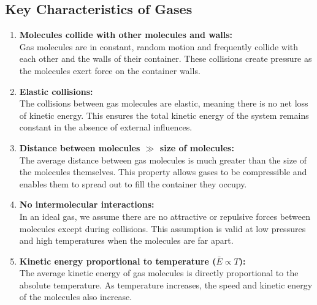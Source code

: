 \documentclass{report}
\begin{document}
\subsection{Key Characteristics of Gases}
\begin{enumerate}
	\item \textbf{Molecules collide with other molecules and walls:} \\
	      Gas molecules are in constant, random motion and frequently collide with each other and the walls of their container. These collisions create pressure as the molecules exert force on the container walls.

	\item \textbf{Elastic collisions:} \\
	      The collisions between gas molecules are elastic, meaning there is no net loss of kinetic energy. This ensures the total kinetic energy of the system remains constant in the absence of external influences.

	\item \textbf{Distance between molecules $\gg$ size of molecules:} \\
	      The average distance between gas molecules is much greater than the size of the molecules themselves. This property allows gases to be compressible and enables them to spread out to fill the container they occupy.

	\item \textbf{No intermolecular interactions:} \\
	      In an ideal gas, we assume there are no attractive or repulsive forces between molecules except during collisions. This assumption is valid at low pressures and high temperatures when the molecules are far apart.

	\item \textbf{Kinetic energy proportional to temperature ($\bar{E} \propto T$):} \\
	      The average kinetic energy of gas molecules is directly proportional to the absolute temperature. As temperature increases, the speed and kinetic energy of the molecules also increase.
\end{enumerate}
\end{document}
